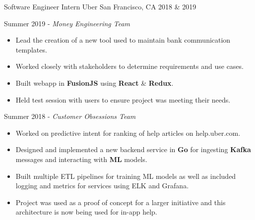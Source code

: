 

\begin{cventries}

  \cventry
    {Software Engineer Intern} %
    {Uber} %
    {San Francisco, CA} %
    {2018 \& 2019} %
    {
      \begin{cvitems} %
        \item {Summer 2019 - \textit{Money Engineering Team}}
        \begin{itemize}
          \item {Lead the creation of a new tool used to maintain bank communication templates.}
          \item {Worked closely with stakeholders to determine requirements and use cases.}
          \item {Built webapp in \textbf{FusionJS} using \textbf{React} \& \textbf{Redux}.}
          \item {Held test session with users to ensure project was meeting their needs.}
        \end{itemize}
        \item {Summer 2018 - \textit{Customer Obsessions Team}}
        \begin{itemize}
          \item {Worked on predictive intent for ranking of help articles on help.uber.com.}
          \item {Designed and implemented a new backend service in \textbf{Go} for ingesting \textbf{Kafka} messages and interacting with \textbf{ML} models.}
          \item {Built multiple ETL pipelines for training ML models as well as included logging and metrics for services using ELK and Grafana.}
          \item {Project was used as a proof of concept for a larger initiative and this architecture is now being used for in-app help.}
        \end{itemize}
      \end{cvitems}
    }


\end{cventries}
